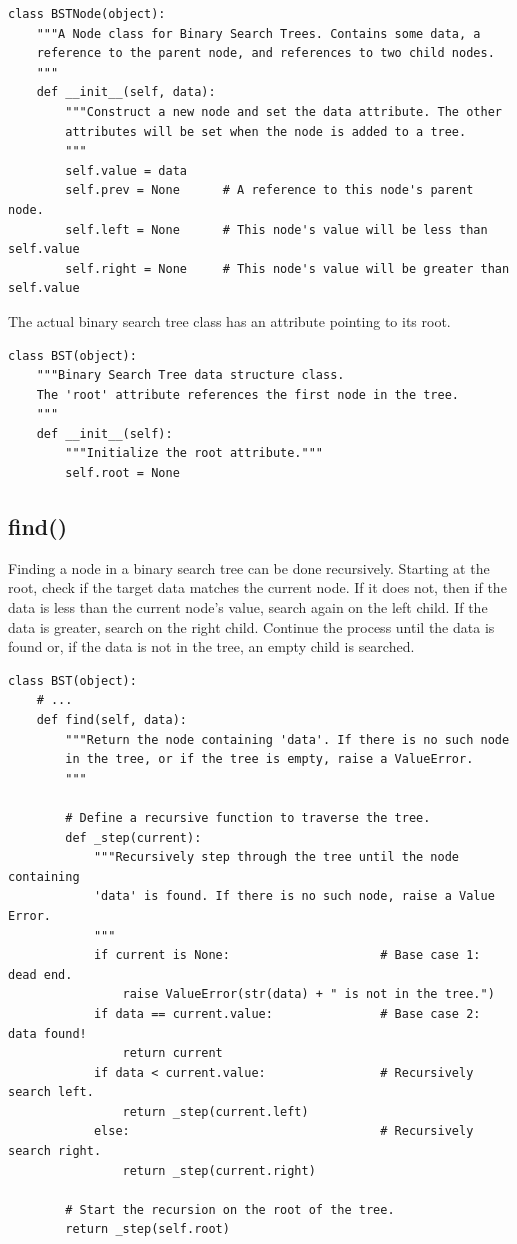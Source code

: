 \begin{lstlisting}
class BSTNode(object):
    """A Node class for Binary Search Trees. Contains some data, a
    reference to the parent node, and references to two child nodes.
    """
    def __init__(self, data):
        """Construct a new node and set the data attribute. The other
        attributes will be set when the node is added to a tree.
        """
        self.value = data
        self.prev = None      # A reference to this node's parent node.
        self.left = None      # This node's value will be less than self.value
        self.right = None     # This node's value will be greater than self.value
\end{lstlisting}

The actual binary search tree class has an attribute pointing to its root.

\begin{lstlisting}
class BST(object):
    """Binary Search Tree data structure class.
    The 'root' attribute references the first node in the tree.
    """
    def __init__(self):
        """Initialize the root attribute."""
        self.root = None
\end{lstlisting}

\subsection*{find()} %

Finding a node in a binary search tree can be done recursively.
Starting at the root, check if the target data matches the current node.
If it does not, then if the data is less than the current node's value, search again on the left child.
If the data is greater, search on the right child.
Continue the process until the data is found or, if the data is not in the tree, an empty child is searched.

\begin{lstlisting}
class BST(object):
    # ...
    def find(self, data):
        """Return the node containing 'data'. If there is no such node
        in the tree, or if the tree is empty, raise a ValueError.
        """

        # Define a recursive function to traverse the tree.
        def _step(current):
            """Recursively step through the tree until the node containing
            'data' is found. If there is no such node, raise a Value Error.
            """
            if current is None:                     # Base case 1: dead end.
                raise ValueError(str(data) + " is not in the tree.")
            if data == current.value:               # Base case 2: data found!
                return current
            if data < current.value:                # Recursively search left.
                return _step(current.left)
            else:                                   # Recursively search right.
                return _step(current.right)

        # Start the recursion on the root of the tree.
        return _step(self.root)
\end{lstlisting}

